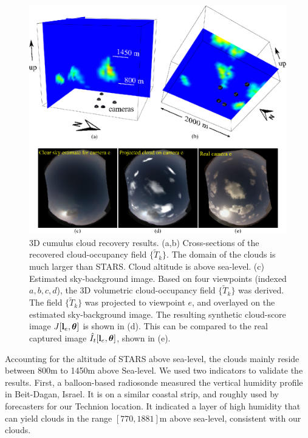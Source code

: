 \documentclass[runningheads]{llncs}
\begin{document}
\begin{figure}[t!]
\begin{center}
   \includegraphics[width=1\linewidth]{figures/clouds_reconstructions.eps}
\end{center}
   \vspace{-0.6cm}
   \caption{3D cumulus cloud recovery results. (a,b) Cross-sections of the recovered cloud-occupancy field $\{\tilde T_k\}$. The domain of the clouds is much larger than STARS. Cloud
   altitude is above sea-level. (c) Estimated sky-background image.  Based on four viewpoints (indexed $a,b,c,d$), the 3D volumetric cloud-occupancy field $\{\tilde T_k\}$ was derived. The field $\{\tilde T_k\}$ was projected to viewpoint $e$, and overlayed on the estimated sky-background image. The resulting synthetic cloud-score image $J[{\bf l}_e,{\bm \theta}]$ is shown in (d). This can be compared to the real captured image $\hat I_t[{\bf l}_e,{\bm \theta}]$, shown in (e).}
\label{fig:projection}
\end{figure}
Accounting for the altitude of STARS above sea-level, the clouds mainly reside between 800m to 1450m above Sea-level. We used two indicators to validate the results. First, a balloon-based radiosonde measured the vertical humidity profile in Beit-Dagan, Israel. It is on a similar coastal strip, and roughly used by forecasters for our Technion location. It indicated a layer of high humidity that can yield clouds in the range $[770,1881]$m above sea-level, consistent with our clouds.
\end{document}
